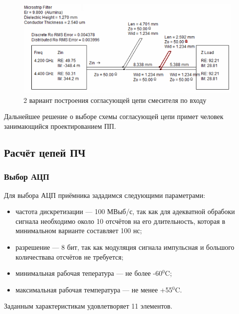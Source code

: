 \documentclass[utf8x, 14pt, oneside, a4paper]{article}
\begin{document}
				\begin{figure}[H]
					\centering
					\includegraphics[width=0.7\linewidth]{"Рисунки/Схемы/Согласование со смесителем Б"}
					\caption{2 вариант построения согласующей цепи смесителя по входу}
					\label{fig:match2b}
				\end{figure}
				
				Дальнейшее решение о выборе схемы согласующей цепи примет человек занимающийся проектированием ПП.
			
		\subsection{Расчёт цепей ПЧ}
			\subsubsection{Выбор АЦП}
				Для выбора АЦП приёмника зададимся следующими параметрами:
				
				\begin{itemize}
					\item частота дискретизации --- 100 МВыб/с, так как для адекватной обрабоки сигнала необходимо около 10 отсчётов на его длительность, которая в минимальном варианте составляет 100 нс;
					\item разрешение --- 8 бит, так как модуляция сигнала импульсная и большого количествава отсчётов не требуется;
					\item минимальная рабочая тепература --- не более -60$^0$C;
					\item максимальная рабочая температура --- не менее +55$^0$C.
				\end{itemize}
				
				\vspace{\baselineskip}
				
				Заданным характеристикам удовлетворяет 11 элементов.
				
\end{document}
